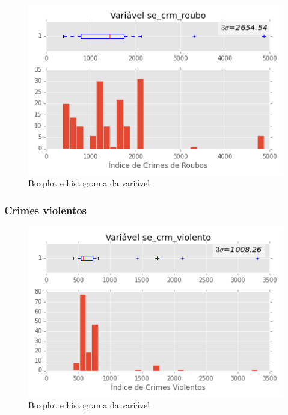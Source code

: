 \begin{figure}[H]
	\centering
	\includegraphics[width=0.8\linewidth]{img/var_se_crm_roubo_boxhist}
	\caption{Boxplot e histograma da variável }
	\label{fig:var_se_crm_roubo_boxhist}
\end{figure} 

\subsubsection{Crimes violentos}

\begin{figure}[H]
	\centering
	\includegraphics[width=0.8\linewidth]{img/var_se_crm_violento_boxhist}
	\caption{Boxplot e histograma da variável }
	\label{fig:var_se_crm_violento_boxhist}
\end{figure} 

